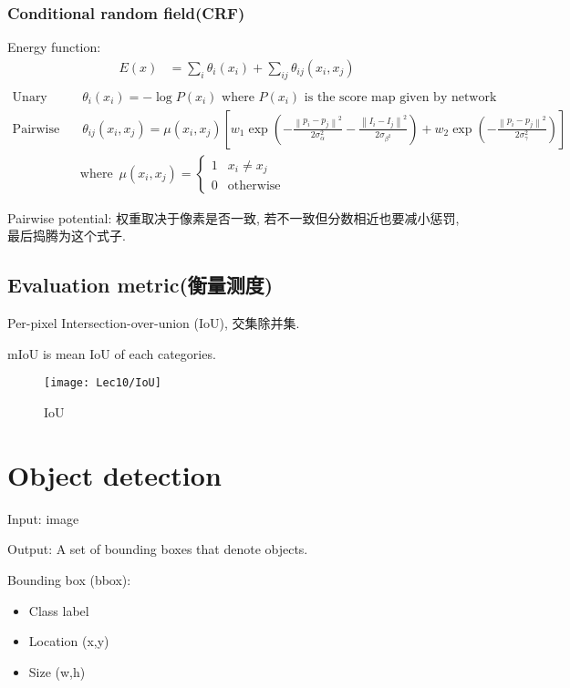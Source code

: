 \subsubsection{Conditional random field(CRF)}
Energy function: 
\begin{align*}
    E(x)&=\sum_i \theta_i (x_i)+\sum_{ij}\theta_{ij}(x_i,x_j)\\
\end{align*}
\begin{align*}
    \text{Unary potential: }&\, \theta_i (x_i)=-\log P(x_i)\,\,\text{where $P(x_i)$ is the score map given by network}\\
    \text{Pairwise potential: }&\, \theta_{ij}(x_i,x_j)=\mu(x_i,x_j)\left[ w_1 \exp\left(-\frac{\left\| p_i-p_j \right\|^2}{2\sigma_{\alpha}^2}-\frac{\left\| I_i-I_j \right\|^2}{2\sigma_{\beta^2}}\right) + w_2 \exp\left(-\frac{\left\| p_i-p_j \right\|^2}{2\sigma_{\gamma}^2}\right)\right]\\
    & \text{where }\, 
    \mu(x_i,x_j)=\left\{\begin{array}{cc}
        1 & x_i\ne x_j\\
        0 & \text{otherwise}
    \end{array} \right. 
\end{align*}

Pairwise potential: 权重取决于像素是否一致, 若不一致但分数相近也要减小惩罚, 最后捣腾为这个式子. 

\subsection{Evaluation metric(衡量测度)}
Per-pixel Intersection-over-union (IoU), 交集除并集.

mIoU is mean IoU of each categories.

\begin{figure}[H]
    \centering
    \texttt{[image: Lec10/IoU]}
    \caption{IoU}
\end{figure}

\section{Object detection}
Input: image

Output: A set of bounding boxes that denote objects. 

Bounding box (bbox):
\begin{itemize}
    \item Class label
    \item Location (x,y)
    \item Size (w,h)
\end{itemize}


